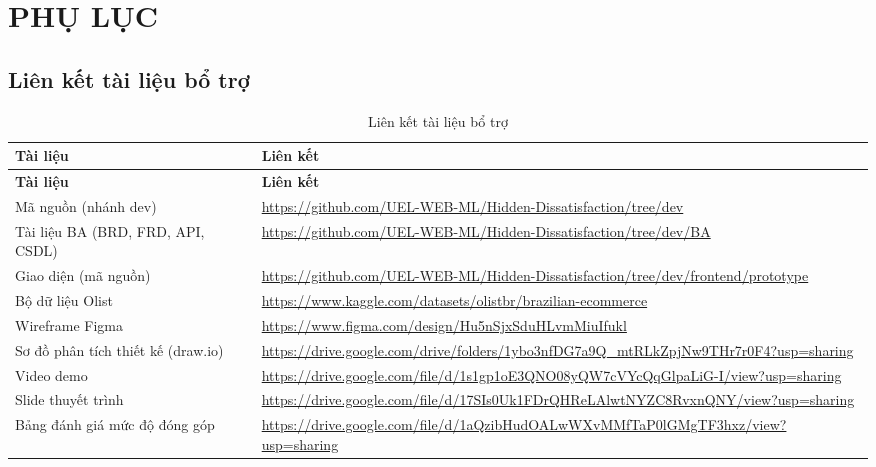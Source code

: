 
\section{PHỤ LỤC}

\subsection{Liên kết tài liệu bổ trợ}

{\small
\renewcommand{\arraystretch}{1.3}
\begin{longtable}{|>{\raggedright\arraybackslash}p{4cm}|>{\raggedright\arraybackslash}p{10.8cm}|}
\caption{Liên kết tài liệu bổ trợ}\label{tab:lien-ket}\\ \hline
\textbf{Tài liệu} & \textbf{Liên kết} \\ \hline \endfirsthead
\hline \textbf{Tài liệu} & \textbf{Liên kết} \\ \hline \endhead
Mã nguồn (nhánh dev) & \url{https://github.com/UEL-WEB-ML/Hidden-Dissatisfaction/tree/dev} \\ \hline
Tài liệu BA (BRD, FRD, API, CSDL) & \url{https://github.com/UEL-WEB-ML/Hidden-Dissatisfaction/tree/dev/BA} \\ \hline
Giao diện (mã nguồn) & \url{https://github.com/UEL-WEB-ML/Hidden-Dissatisfaction/tree/dev/frontend/prototype} \\ \hline
Bộ dữ liệu Olist & \url{https://www.kaggle.com/datasets/olistbr/brazilian-ecommerce} \\ \hline
Wireframe Figma & \url{https://www.figma.com/design/Hu5nSjxSduHLvmMiuIfukl} \\ \hline
Sơ đồ phân tích thiết kế (draw.io) & \url{https://drive.google.com/drive/folders/1ybo3nfDG7a9Q_mtRLkZpjNw9THr7r0F4?usp=sharing} \\ \hline
Video demo & \url{https://drive.google.com/file/d/1s1gp1oE3QNO08yQW7cVYcQqGlpaLiG-I/view?usp=sharing} \\ \hline
Slide thuyết trình & \url{https://drive.google.com/file/d/17SIs0Uk1FDrQHReLAlwtNYZC8RvxnQNY/view?usp=sharing} \\ \hline
Bảng đánh giá mức độ đóng góp & \url{https://drive.google.com/file/d/1aQzibHudOALwWXvMMfTaP0lGMgTF3hxz/view?usp=sharing} \\ \hline
\end{longtable}
}


